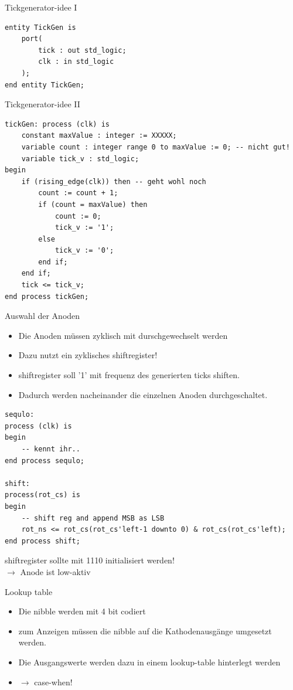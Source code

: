 \documentclass[aspectratio=169,presentation]{beamer}
\begin{document}
\begin{frame} [fragile] {Tickgenerator-idee I}
	\begin{lstlisting}
entity TickGen is
    port(
        tick : out std_logic;
        clk : in std_logic
    );
end entity TickGen;
	\end{lstlisting}
\end{frame}


\begin{frame} [fragile] {Tickgenerator-idee II}
	\begin{lstlisting}
tickGen: process (clk) is
	constant maxValue : integer := XXXXX;
	variable count : integer range 0 to maxValue := 0; -- nicht gut!
	variable tick_v : std_logic;
begin
	if (rising_edge(clk)) then -- geht wohl noch
		count := count + 1;
		if (count = maxValue) then
			count := 0;
			tick_v := '1';
		else
			tick_v := '0';
		end if;
	end if;
	tick <= tick_v;
end process tickGen;
	\end{lstlisting}
\end{frame}


\begin{frame} {Auswahl der Anoden}
	\begin{itemize}
		\item Die Anoden müssen zyklisch mit durschgewechselt werden
		\item Dazu nutzt ein zyklisches shiftregister!
		\item shiftregister soll '1' mit frequenz des generierten ticks shiften.
		\item Dadurch werden nacheinander die einzelnen Anoden durchgeschaltet.
	\end{itemize}
\end{frame}


\begin{frame} [fragile]
	\begin{lstlisting}
sequlo:
process (clk) is
begin
	-- kennt ihr..
end process sequlo;

shift:
process(rot_cs) is 
begin
	-- shift reg and append MSB as LSB
	rot_ns <= rot_cs(rot_cs'left-1 downto 0) & rot_cs(rot_cs'left);
end process shift;
	\end{lstlisting}
	shiftregister sollte mit \grqq{}1110\grqq{} initialisiert werden!\\
	$\rightarrow$ Anode ist low-aktiv
\end{frame}


\begin{frame} {Lookup table}
	\begin{itemize}
		\item Die nibble werden mit 4 bit codiert
		\item zum Anzeigen müssen die nibble auf die Kathodenausgänge umgesetzt werden.
		\item Die Ausgangswerte werden dazu in einem lookup-table hinterlegt werden
		\item $\rightarrow$ case-when!
	\end{itemize}
\end{frame}
\end{document}
